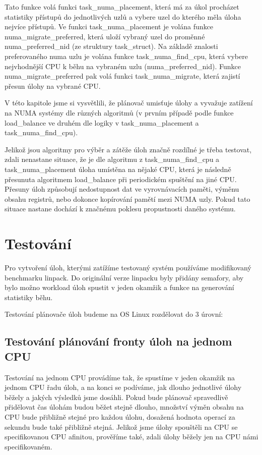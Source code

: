 \documentclass[a4paper,12pt]{article}
\begin{document}
Tato funkce volá funkci task\_numa\_placement, která má za úkol procházet statistiky přístupů do jednotlivých uzlů a vybere uzel do kterého měla úloha nejvíce přístupů. Ve funkci task\_numa\_placement je volána funkce numa\_migrate\_preferred, která uloží vybraný uzel do proměnné numa\_preferred\_nid (ze struktury task\_struct).
Na základě znalosti preferovaného numa uzlu je volána funkce task\_numa\_find\_cpu, která vybere nejvhodnější CPU k běhu na vybraném uzlu (numa\_preferred\_nid).
Funkce numa\_migrate\_preferred pak volá funkci task\_numa\_migrate, která zajistí přesun úlohy na vybrané CPU.

V této kapitole jsme si vysvětlili, že plánovač umisťuje úlohy a vyvažuje zatížení na NUMA systémy dle různých algoritmů (v prvním případě podle funkce load\_balance ve druhém dle logiky v task\_numa\_placement a task\_numa\_find\_cpu).

Jelikož jsou algoritmy pro výběr a zátěže úloh značně rozdílné je třeba testovat, zdali nenastane situace, že je dle algoritmu z task\_numa\_find\_cpu a task\_numa\_placement úloha umístěna na nějaké CPU, která je následně přesunuta algoritmem load\_balance při periodickém spuštění na jiné CPU. Přesuny úloh způsobují nedostupnost dat ve vyrovnávacích paměti, výměnu obsahu registrů, nebo dokonce kopírování pamětí mezi NUMA uzly. Pokud tato situace nastane dochází k značnému poklesu propustnosti daného systému. 

\section{Testování}

Pro vytvoření úloh, kterými zatížíme testovaný systém používáme modifikovaný benchmarku linpack. Do originální verze linpacku byly přidány semafory, aby bylo možno workload úloh spustit v jeden okamžik a funkce na generování statistiky běhu.

Testování plánovače úloh budeme na OS Linux rozdělovat do 3 úrovní:

\subsection{Testování plánování fronty úloh na jednom CPU}

Testování na jednom CPU provádíme tak, že spustíme v jeden okamžik na jednom CPU řadu úloh, a na konci se podíváme, jak dlouho jednotlivé úlohy běžely a jakých výsledků jsme dosáhli. Pokud bude plánovač spravedlivě přidělovat čas úlohám budou běžet stejně dlouho, množství výměn obsahu na CPU bude přibližně stejné pro každou úlohu, dosažená hodnota operací za sekundu bude také přibližně stejná. Jelikož jsme úlohy spouštěli na CPU se specifikovanou CPU afinitou, prověříme také, zdali úlohy běžely jen na CPU námi specifikovaném.
\end{document}
